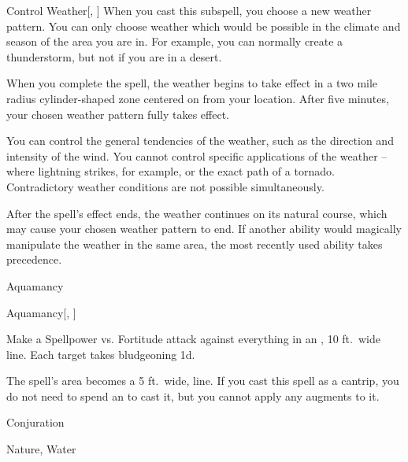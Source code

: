 \begin{ability}[\nth{7}]{Control Weather}[, ]
When you cast this subspell, you choose a new weather pattern.
You can only choose weather which would be possible in the climate and season of the area you are in.
For example, you can normally create a thunderstorm, but not if you are in a desert.

When you complete the spell, the weather begins to take effect in a two mile radius cylinder-shaped zone centered on from your location.
After five minutes, your chosen weather pattern fully takes effect.

You can control the general tendencies of the weather, such as the direction and intensity of the wind.
You cannot control specific applications of the weather -- where lightning strikes, for example, or the exact path of a tornado.
Contradictory weather conditions are not possible simultaneously.

After the spell's effect ends, the weather continues on its natural course, which may cause your chosen weather pattern to end.
If another ability would magically manipulate the weather in the same area, the most recently used ability takes precedence.
\end{ability}
\vspace{0.25em}

\newpage
\begin{spellsection}{Aquamancy}

\begin{spellheader}
\end{spellheader}


\begin{ability}{Aquamancy}[, ]

Make a Spellpower vs. Fortitude attack against everything in an \arealarge, 10 ft.\ wide line.
\hit Each target takes bludgeoning  \minus1d.

\end{ability}



 The spell's area becomes a 5 ft.\ wide, \areamed line. If you cast this spell as a cantrip,
you do not need to spend an  to cast it,
but you cannot apply any augments to it.


 Conjuration

 Nature, Water
\end{spellsection}


